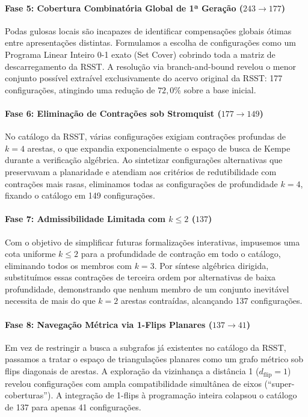 \documentclass[11pt,a4paper]{article}
\theoremstyle{plain}
\theoremstyle{definition}
\begin{document}
\paragraph{Fase 5: Cobertura Combinatória Global de 1ª Geração ($243 \to 177$)}
Podas gulosas locais são incapazes de identificar compensações globais ótimas entre apresentações distintas. Formulamos a escolha de configurações como um Programa Linear Inteiro 0-1 exato (Set Cover) cobrindo toda a matriz de descarregamento da RSST. A resolução via branch-and-bound revelou o menor conjunto possível extraível exclusivamente do acervo original da RSST: 177 configurações, atingindo uma redução de $72,0\%$ sobre a base inicial.

\paragraph{Fase 6: Eliminação de Contrações sob Stromquist ($177 \to 149$)}
No catálogo da RSST, várias configurações exigiam contrações profundas de $k = 4$ arestas, o que expandia exponencialmente o espaço de busca de Kempe durante a verificação algébrica. Ao sintetizar configurações alternativas que preservavam a planaridade e atendiam aos critérios de redutibilidade com contrações mais rasas, eliminamos todas as configurações de profundidade $k=4$, fixando o catálogo em 149 configurações.

\paragraph{Fase 7: Admissibilidade Limitada com $k \le 2$ ($137$)}
Com o objetivo de simplificar futuras formalizações interativas, impusemos uma cota uniforme $k \le 2$ para a profundidade de contração em todo o catálogo, eliminando todos os membros com $k=3$. Por síntese algébrica dirigida, substituímos essas contrações de terceira ordem por alternativas de baixa profundidade, demonstrando que nenhum membro de um conjunto inevitável necessita de mais do que $k=2$ arestas contraídas, alcançando 137 configurações.

\paragraph{Fase 8: Navegação Métrica via 1-Flips Planares ($137 \to 41$)}
Em vez de restringir a busca a subgrafos já existentes no catálogo da RSST, passamos a tratar o espaço de triangulações planares como um grafo métrico sob flips diagonais de arestas. A exploração da vizinhança a distância 1 ($d_{\text{flip}} = 1$) revelou configurações com ampla compatibilidade simultânea de eixos (``super-coberturas''). A integração de 1-flips à programação inteira colapsou o catálogo de 137 para apenas 41 configurações.
\end{document}
